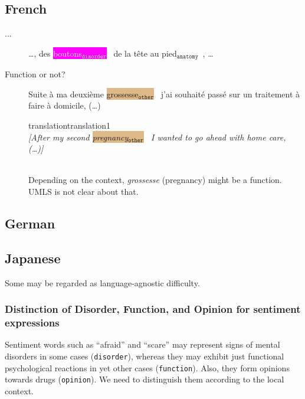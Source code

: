\documentclass[12pt]{article}
\theoremstyle{definition}
\newcommand{\anatomy}[1]{\colorbox{dollarbill}{#1$_{\texttt{anatomy}}$}\ }
\newcommand{\disorder}[1]{\colorbox{fuchsia}{\textcolor{white}{#1$_{\texttt{disorder}}$}}\ }
\newcommand{\other}[1]{\colorbox{burlywood}{#1$_{\texttt{other}}$}\ }
\newcommand{\dis}{\texttt{disorder}\xspace}
\newcommand{\translation}[1]{\begin{ocg}{translation}{translation}{1}\footnotesize{\\\textit{[#1]}}\end{ocg}}
\begin{document}
\subsection{French}

\begin{description}
    \item[...] \ldots, des \disorder{boutons} \anatomy{de la tête au pied}, \ldots
    
    \item[Function or not?] Suite à ma deuxième \other{grossesse} j'ai souhaité passé sur un traitement à faire à domicile, (\ldots) \translation{After my second \other{pregnancy} I wanted to go ahead with home care, (\ldots)}\\
    Depending on the context, \textit{grossesse} (pregnancy) might be a function. UMLS is not clear about that.

\end{description}

\subsection{German}

\subsection{Japanese}

Some may be regarded as language-agnostic difficulty.

\subsubsection{Distinction of Disorder, Function, and Opinion for sentiment expressions}

Sentiment words such as ``afraid'' and ``scare'' may represent signs of mental disorders in some cases (\dis), whereas they may exhibit just functional psychological reactions in yet other cases (\texttt{function}).
Also, they form opinions towards drugs (\texttt{opinion}).
We need to distinguish them according to the local context.
\end{document}
